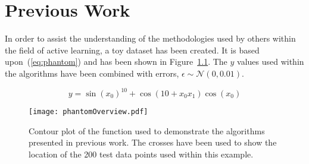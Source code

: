 
\chapter{Previous Work}
\label{ch:2}

\graphicspath{{Chapter2/Figs/Vector/}{Chapter2/Figs/Raster/}}







In order to assist the understanding of the methodologies used by others within the field of active learning, a toy dataset has been created. It is based upon~(\ref{eq:phantom}) and has been shown in Figure~\ref{fig:phantom}. The $y$ values used within the algorithms have been combined with errors, $\epsilon{}\sim{}\mathcal{N}(0, 0.01)$.

\begin{equation}
    y = \sin{(x_0)}^{10} + \cos{(10 + x_0 x_1)}\cos{(x_0)}
    \label{eq:phantom}
\end{equation}

\begin{figure}[h]
    \begin{center}
        \texttt{[image: phantomOverview.pdf]}
        \caption[Example Dataset for Representation of Ideas]{Contour plot of the function used to demonstrate the algorithms presented in previous work. The crosses have been used to show the location of the 200 test data points used within this example.}
        \label{fig:phantom}
    \end{center}
\end{figure}

